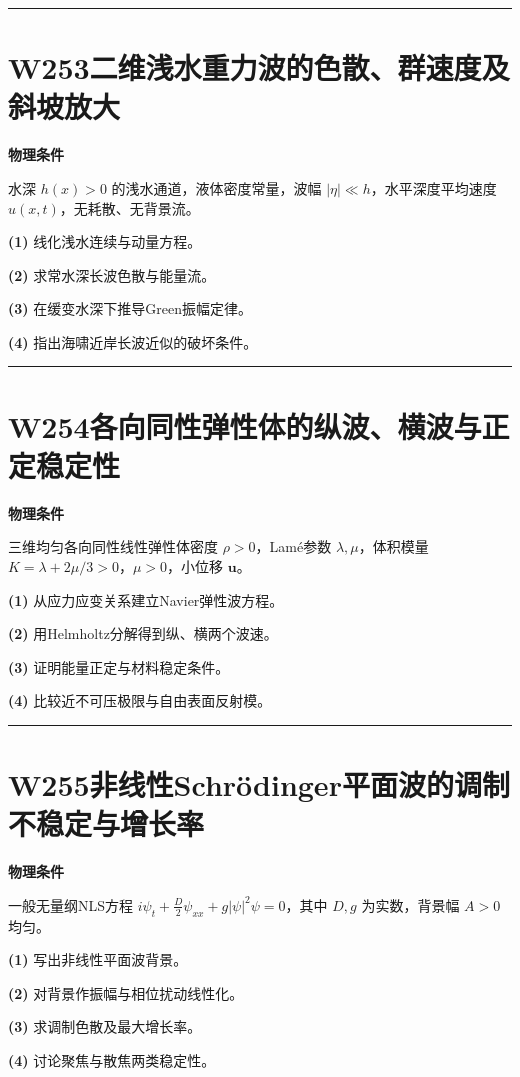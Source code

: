 \documentclass[UTF8,a4paper,11pt,oneside,openany]{ctexbook}
\begin{document}
\par\bigskip\hrule\bigskip
\section*{W253\quad 二维浅水重力波的色散、群速度及斜坡放大}
\textbf{物理条件}\par 水深 \(h(x)>0\) 的浅水通道，液体密度常量，波幅 \(|\eta|\ll h\)，水平深度平均速度 \(u(x,t)\)，无耗散、无背景流。
\par\noindent\textbf{(1)} 线化浅水连续与动量方程。
\par\noindent\textbf{(2)} 求常水深长波色散与能量流。
\par\noindent\textbf{(3)} 在缓变水深下推导Green振幅定律。
\par\noindent\textbf{(4)} 指出海啸近岸长波近似的破坏条件。

\par\bigskip\hrule\bigskip
\section*{W254\quad 各向同性弹性体的纵波、横波与正定稳定性}
\textbf{物理条件}\par 三维均匀各向同性线性弹性体密度 \(\rho>0\)，Lamé参数 \(\lambda,\mu\)，体积模量 \(K=\lambda+2\mu/3>0\)，\(\mu>0\)，小位移 \(\boldsymbol u\)。
\par\noindent\textbf{(1)} 从应力应变关系建立Navier弹性波方程。
\par\noindent\textbf{(2)} 用Helmholtz分解得到纵、横两个波速。
\par\noindent\textbf{(3)} 证明能量正定与材料稳定条件。
\par\noindent\textbf{(4)} 比较近不可压极限与自由表面反射模。

\par\bigskip\hrule\bigskip
\section*{W255\quad 非线性Schrödinger平面波的调制不稳定与增长率}
\textbf{物理条件}\par 一般无量纲NLS方程 \(i\psi_t+\tfrac D2\psi_{xx}+g|\psi|^2\psi=0\)，其中 \(D,g\) 为实数，背景幅 \(A>0\) 均匀。
\par\noindent\textbf{(1)} 写出非线性平面波背景。
\par\noindent\textbf{(2)} 对背景作振幅与相位扰动线性化。
\par\noindent\textbf{(3)} 求调制色散及最大增长率。
\par\noindent\textbf{(4)} 讨论聚焦与散焦两类稳定性。
\end{document}
